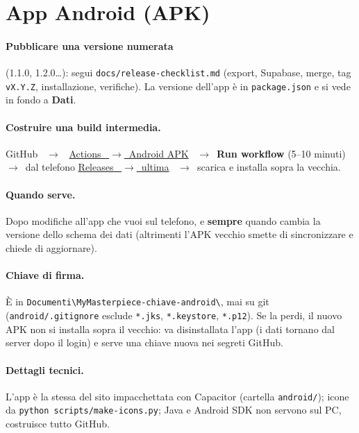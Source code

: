 \documentclass[11pt,a4paper]{article}
\newcommand{\ra}{\unskip\nobreak\ $\rightarrow$\ \ignorespaces}            %
\newcommand{\bt}[1]{\textbf{#1}}               %
\newcommand{\code}[1]{\texttt{#1}}             %
\newcommand{\repo}{https://github.com/AleCovi04/My-Masterpiece}
\begin{document}
\section{App Android (APK)}\label{sec:apk}

\paragraph{Pubblicare una versione numerata} (1.1.0, 1.2.0\ldots): segui
\code{docs/release-checklist.md} (export, Supabase, merge, tag \code{vX.Y.Z}, installazione,
verifiche). La versione dell'app è in \code{package.json} e si vede in fondo a \bt{Dati}.

\paragraph{Costruire una build intermedia.} GitHub \ra
\href{\repo/actions/workflows/android-apk.yml}{Actions \ra Android APK} \ra \bt{Run workflow}
(5--10 minuti) \ra dal telefono \href{\repo/releases/latest}{Releases \ra ultima} \ra scarica e
installa sopra la vecchia.

\paragraph{Quando serve.} Dopo modifiche all'app che vuoi sul telefono, e \bt{sempre} quando cambia
la versione dello schema dei dati (altrimenti l'APK vecchio smette di sincronizzare e chiede di aggiornare).

\paragraph{Chiave di firma.} È in \code{Documenti\textbackslash\allowbreak MyMasterpiece-\allowbreak chiave-android\textbackslash},
mai su git (\code{android/.gitignore} esclude \code{*.jks}, \code{*.keystore}, \code{*.p12}). Se la perdi, il nuovo APK non si installa sopra il vecchio: va disinstallata l'app (i dati
tornano dal server dopo il login) e serve una chiave nuova nei segreti GitHub.

\paragraph{Dettagli tecnici.} L'app è la stessa del sito impacchettata con Capacitor (cartella
\code{android/}); icone da \code{python scripts/make-icons.py}; Java e Android SDK non servono sul PC,
costruisce tutto GitHub.
\end{document}
